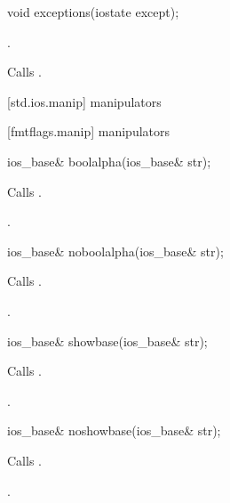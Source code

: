 %
\begin{itemdecl}
void exceptions(iostate except);
\end{itemdecl}

\begin{itemdescr}
\pnum
\postconditions
{}.

\pnum
\effects
Calls
.
\end{itemdescr}

[std.ios.manip]{ manipulators}

[fmtflags.manip]{ manipulators}

%
\begin{itemdecl}
ios_base& boolalpha(ios_base& str);
\end{itemdecl}

\begin{itemdescr}
\pnum
\effects
Calls
.

\pnum
\returns
{}.
\end{itemdescr}

%
\begin{itemdecl}
ios_base& noboolalpha(ios_base& str);
\end{itemdecl}

\begin{itemdescr}
\pnum
\effects
Calls
.

\pnum
\returns
{}.
\end{itemdescr}

%
\begin{itemdecl}
ios_base& showbase(ios_base& str);
\end{itemdecl}

\begin{itemdescr}
\pnum
\effects
Calls
.

\pnum
\returns
{}.
\end{itemdescr}

%
\begin{itemdecl}
ios_base& noshowbase(ios_base& str);
\end{itemdecl}

\begin{itemdescr}
\pnum
\effects
Calls
.

\pnum
\returns
{}.
\end{itemdescr}

